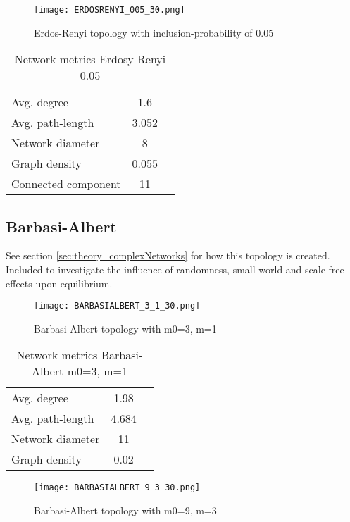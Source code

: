 \documentclass[Bachelorarbeit.tex]{subfiles}
\begin{document}
\begin{figure}[H]
	\centering
  \texttt{[image: ERDOSRENYI\_005\_30.png]}
	\caption{Erdos-Renyi topology with inclusion-probability of 0.05}
	\label{fig:topology_ERDOSRENYI_005_30}
\end{figure}

\begin{table}[H]
	\centering
	\caption{Network metrics Erdosy-Renyi 0.05}
	\begin{tabular} { l c r }
		\hline
		Avg. degree & 1.6 \\
		Avg. path-length & 3.052 \\
		Network diameter & 8 \\
		Graph density & 0.055 \\
		Connected component & 11 \\
		\hline
	\end{tabular}
\end{table}

\subsection{Barbasi-Albert}
See section \ref{sec:theory_complexNetworks} for how this topology is created.
\medskip
Included to investigate the influence of randomness, small-world and scale-free effects upon equilibrium.

\begin{figure}[H]
	\centering
  \texttt{[image: BARBASIALBERT\_3\_1\_30.png]}
	\caption{Barbasi-Albert topology with m0=3, m=1}
	\label{fig:topology_BARBASIALBERT_3_1_30}
\end{figure}

\begin{table}[H]
	\centering
	\caption{Network metrics Barbasi-Albert m0=3, m=1}
	\begin{tabular} { l c r }
		\hline
		Avg. degree & 1.98 \\
		Avg. path-length & 4.684 \\
		Network diameter & 11 \\
		Graph density & 0.02 \\
		\hline
	\end{tabular}
\end{table}

\begin{figure}[H]
	\centering
  \texttt{[image: BARBASIALBERT\_9\_3\_30.png]}
	\caption{Barbasi-Albert topology with m0=9, m=3}
	\label{fig:topology_BARBASIALBERT_9_3_30}
\end{figure}
\end{document}
